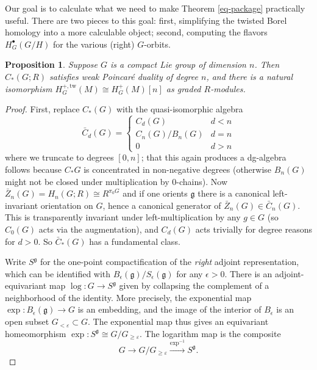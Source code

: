 \documentclass{memo-l}
\newtheorem{proposition}[theorem]{Proposition}
\theoremstyle{definition}
\theoremstyle{remark}
\numberwithin{section}{chapter}
\numberwithin{equation}{chapter}
\begin{document}
Our goal is to calculate what we need to make Theorem \ref{eq-package} practically useful. There are two pieces to this goal: first, simplifying the twisted Borel homology into a more calculable object; second, computing the flavors $H^\bullet_G(G/H)$ for the various (right) $G$-orbits.\\ 

\begin{proposition}\label{prop:G-is-weak-PD}
Suppose $G$ is a compact Lie group of dimension $n$. Then $C_*(G;R)$ satisfies weak Poincar\'e duality of degree $n$, and there is a natural isomorphism $H^{+,\text{tw}}_{G}(M) \cong H^+_G(M)[n]$ as graded $R$-modules. 
\end{proposition}

\begin{proof}
First, replace $C_*(G)$ with the quasi-isomorphic algebra $$\bar C_d(G) = \begin{cases} C_d(G) & d < n \\ C_n(G)/B_n(G) & d = n \\ 0 & d > n \end{cases}$$ where we truncate to degrees $[0, n]$; that this again produces a dg-algebra follows because $C_* G$ is concentrated in non-negative degrees (otherwise $B_n(G)$ might not be closed under multiplication by $0$-chains). Now $\bar Z_n(G) = H_n(G;R) \cong R^{\pi_0 G}$ and if one orients $\mathfrak g$ there is a canonical left-invariant orientation on $G$, hence a canonical generator of $\bar Z_n(G) \in \bar C_n(G)$. This is transparently invariant under left-multiplication by any $g \in G$ (so $C_0(G)$ acts via the augmentation), and $C_d(G)$ acts trivially for degree reasons for $d > 0$. So $\bar C_*(G)$ has a fundamental class.

Write $S^{\mathfrak g}$ for the one-point compactification of the \emph{right} adjoint representation, which can be identified with $B_\epsilon(\mathfrak g)/S_\epsilon(\mathfrak g)$ for any $\epsilon > 0$. There is an adjoint-equivariant map $\log: G \to S^{\mathfrak g}$ given by collapsing the complement of a neighborhood of the identity. More precisely, the exponential map $\exp: B_\epsilon(\mathfrak g) \to G$ is an embedding, and the image of the interior of $B_\epsilon$ is an open subset $G_{< \varepsilon} \subset G$. The exponential map thus gives an equivariant homeomorphism $\exp: S^{\mathfrak g} \cong G/G_{\ge \varepsilon}.$ The logarithm map is the composite $$G \to G/G_{\ge \varepsilon} \xrightarrow{\exp^{-1}} S^{\mathfrak g}.$$ 


\end{proof}
\end{document}
